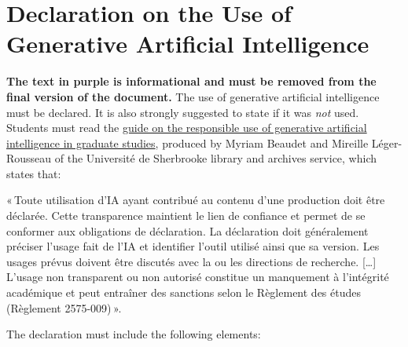 \chapter*{Declaration on the Use of Generative Artificial Intelligence}

\textcolor{eclipsepurple}{\textbf{The text in purple is informational and must be removed from the final version of the document.} The use of generative artificial intelligence must be declared. It is also strongly suggested to state if it was \emph{not} used. Students must read the \href{https://libguides.biblio.usherbrooke.ca/ld.php?content_id=37838948}{guide on the responsible use of generative artificial intelligence in graduate studies}, produced by Myriam Beaudet and Mireille Léger-Rousseau of the Université de Sherbrooke library and archives service, which states that:}

\begin{customquote}
\textcolor{eclipsepurple}{%
«\,Toute utilisation d'IA ayant contribué au contenu d’une production doit être déclarée. Cette transparence maintient le lien de confiance et permet de se conformer aux obligations de déclaration. La déclaration doit généralement préciser l'usage fait de l'IA et identifier l'outil utilisé ainsi que sa version. Les usages prévus doivent être discutés avec la ou les directions de recherche. […] L'usage non transparent ou non autorisé constitue un manquement à l'intégrité académique et peut entraîner des sanctions selon le Règlement des études (Règlement 2575-009)\,».%
}
\end{customquote}

\textcolor{eclipsepurple}{The declaration must include the following elements:}

